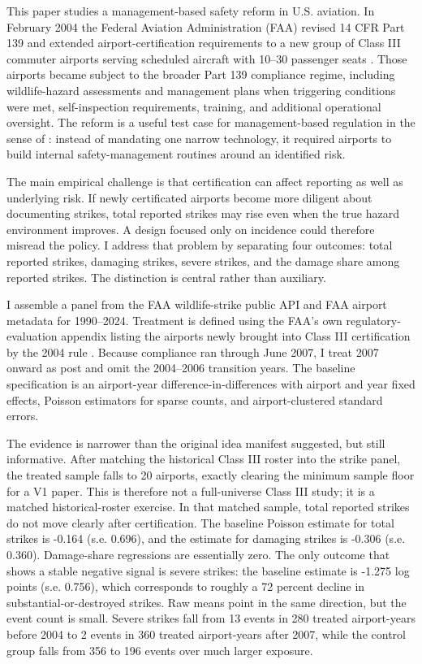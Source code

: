 \documentclass[12pt]{article}
\begin{document}
This paper studies a management-based safety reform in U.S. aviation. In February 2004 the Federal Aviation Administration (FAA) revised 14 CFR Part 139 and extended airport-certification requirements to a new group of Class III commuter airports serving scheduled aircraft with 10--30 passenger seats \citep{faa_reg_eval_2004,faa_part139_2026}. Those airports became subject to the broader Part 139 compliance regime, including wildlife-hazard assessments and management plans when triggering conditions were met, self-inspection requirements, training, and additional operational oversight. The reform is a useful test case for management-based regulation in the sense of \citet{Coglianese_2003}: instead of mandating one narrow technology, it required airports to build internal safety-management routines around an identified risk.

The main empirical challenge is that certification can affect reporting as well as underlying risk. If newly certificated airports become more diligent about documenting strikes, total reported strikes may rise even when the true hazard environment improves. A design focused only on incidence could therefore misread the policy. I address that problem by separating four outcomes: total reported strikes, damaging strikes, severe strikes, and the damage share among reported strikes. The distinction is central rather than auxiliary.

I assemble a panel from the FAA wildlife-strike public API and FAA airport metadata for 1990--2024. Treatment is defined using the FAA's own regulatory-evaluation appendix listing the airports newly brought into Class III certification by the 2004 rule \citep{faa_reg_eval_2004}. Because compliance ran through June 2007, I treat 2007 onward as post and omit the 2004--2006 transition years. The baseline specification is an airport-year difference-in-differences with airport and year fixed effects, Poisson estimators for sparse counts, and airport-clustered standard errors.

The evidence is narrower than the original idea manifest suggested, but still informative. After matching the historical Class III roster into the strike panel, the treated sample falls to 20 airports, exactly clearing the minimum sample floor for a V1 paper. This is therefore not a full-universe Class III study; it is a matched historical-roster exercise. In that matched sample, total reported strikes do not move clearly after certification. The baseline Poisson estimate for total strikes is -0.164 (s.e. 0.696), and the estimate for damaging strikes is -0.306 (s.e. 0.360). Damage-share regressions are essentially zero. The only outcome that shows a stable negative signal is severe strikes: the baseline estimate is -1.275 log points (s.e. 0.756), which corresponds to roughly a 72 percent decline in substantial-or-destroyed strikes. Raw means point in the same direction, but the event count is small. Severe strikes fall from 13 events in 280 treated airport-years before 2004 to 2 events in 360 treated airport-years after 2007, while the control group falls from 356 to 196 events over much larger exposure.
\end{document}
